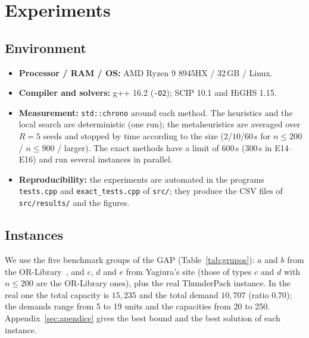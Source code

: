 \documentclass[11pt,a4paper]{article}
\newcommand{\code}[1]{\texttt{#1}}
\begin{document}
\section{Experiments}\label{sec:exp}
\subsection{Environment}
\begin{itemize}
  \item \textbf{Processor / RAM / OS:} AMD Ryzen 9 8945HX / 32\,GB / Linux.
  \item \textbf{Compiler and solvers:} g++ 16.2 (\code{-O2}); SCIP 10.1 and HiGHS 1.15.
  \item \textbf{Measurement:} \code{std::chrono} around each method. The heuristics and the local
        search are deterministic (one run); the metaheuristics are averaged over $R=5$ seeds and
        stopped by time according to the size ($2$/$10$/$60$\,s for $n\le200$ / $n\le900$ /
        larger). The exact methods have a limit of 600\,s (300\,s in E14--E16) and run several
        instances in parallel.
  \item \textbf{Reproducibility:} the experiments are automated in the programs \code{tests.cpp}
        and \code{exact\_tests.cpp} of \code{src/}; they produce the CSV files of
        \code{src/results/} and the figures.
\end{itemize}

\subsection{Instances}
We use the five benchmark groups of the GAP (Table~\ref{tab:grupos}): $a$ and $b$ from the
OR-Library~\cite{beasley1990}, and $c$, $d$ and $e$ from Yagiura's site (those of types $c$ and $d$
with $n\le200$ are the OR-Library ones), plus the real ThunderPack instance. In the real one the
total capacity is $15{,}235$ and the total demand $10{,}707$ (ratio $0.70$); the demands range from
5 to 19 units and the capacities from 20 to 250. Appendix~\ref{sec:apendice} gives the best bound
and the best solution of each instance.
\end{document}
